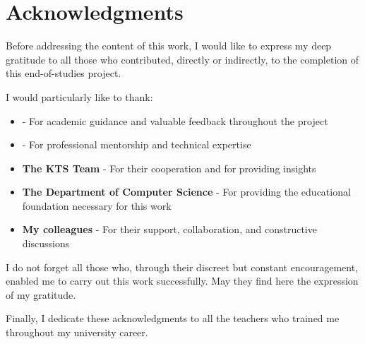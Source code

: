 \chapter*{Acknowledgments}

Before addressing the content of this work, I would like to express my deep gratitude to all those who contributed, directly or indirectly, to the completion of this end-of-studies project.

I would particularly like to thank:

\vspace{0.5cm}

\begin{itemize}[leftmargin=2cm]
    \item \textbf{\supervisoracademic} - For academic guidance and valuable feedback throughout the project
    
    \item \textbf{\supervisorcompany} - For professional mentorship and technical expertise
    
    \item \textbf{The KTS Team} - For their cooperation and for providing insights 
    
    \item \textbf{The Department of Computer Science} - For providing the educational foundation necessary for this work
    
    \item \textbf{My colleagues} - For their support, collaboration, and constructive discussions
\end{itemize}

\vspace{1cm}

I do not forget all those who, through their discreet but constant encouragement, enabled me to carry out this work successfully. May they find here the expression of my gratitude.

Finally, I dedicate these acknowledgments to all the teachers who trained me throughout my university career.

\vspace{20cm}